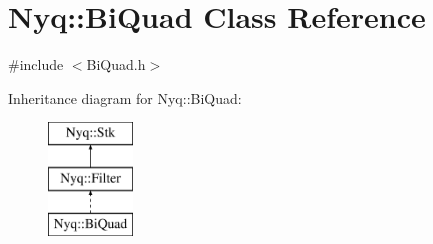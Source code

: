 \hypertarget{class_nyq_1_1_bi_quad}{}\section{Nyq\+:\+:Bi\+Quad Class Reference}
\label{class_nyq_1_1_bi_quad}


{\ttfamily \#include $<$Bi\+Quad.\+h$>$}

Inheritance diagram for Nyq\+:\+:Bi\+Quad\+:\begin{figure}[H]
\begin{center}
\leavevmode
\includegraphics[height=3.000000cm]{class_nyq_1_1_bi_quad}
\end{center}
\end{figure}
